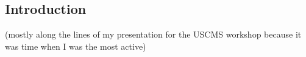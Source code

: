 \subsection{Introduction}
(mostly along the lines of my presentation for the USCMS workshop because it was time when I was the most active)
